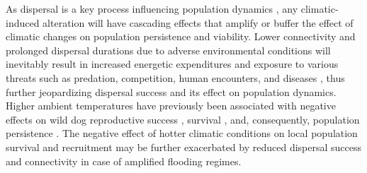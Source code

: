 \documentclass[../FinalThesis.tex]{subfiles}
\begin{document}

As dispersal is a key process influencing population dynamics
\citep{Hanski.1999, Clobert.2012}, any climatic-induced alteration will have
cascading effects that amplify or buffer the effect of climatic changes on
population persistence and viability. Lower connectivity and prolonged
dispersal durations due to adverse environmental conditions will inevitably
result in increased energetic expenditures and exposure to various threats such
as predation, competition, human encounters, and diseases \citep{Alberts.1995,
Yoder.2004, Stamps.2005, Bonte.2012}, thus further jeopardizing dispersal
success and its effect on population dynamics. Higher ambient temperatures have
previously been associated with negative effects on wild dog reproductive
success \citep{Woodroffe.2017, Abrahms.2022}, survival \citep{Rabaiotti.2021},
and, consequently, population persistence \citep{Rabaiotti.2023}. The negative
effect of hotter climatic conditions on local population survival and
recruitment may be further exacerbated by reduced dispersal success and
connectivity in case of amplified flooding regimes.
\end{document}
